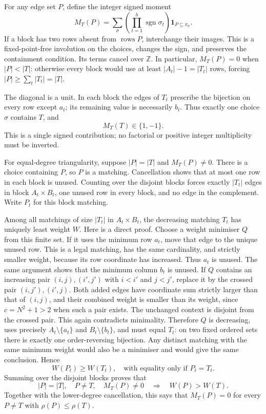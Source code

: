 \documentclass[11pt,a4paper]{article}
\theoremstyle{definition}\newtheorem{definition}[theorem]{Definition}
\theoremstyle{remark}\newtheorem{remark}[theorem]{Remark}
\begin{document}
For any edge set $P$, define the integer signed moment
\[
 M_T(P)=\sum_{\sigma}
     \left(\prod_{t=1}^{h}\operatorname{sgn}\sigma_t\right)
     \boldsymbol{1}_{P\subseteq\pi_\sigma}.
\]
If a block has two rows absent from $\operatorname{rows}P$, interchange
their images.  This is a fixed-point-free involution on the choices,
changes the sign, and preserves the containment condition.  Its terms
cancel over $\mathbb Z$.  In particular, $M_T(P)=0$ when $|P|<|T|$:
otherwise every block would use at least $|A_t|-1=|T_t|$ rows, forcing
$|P|\geq\sum_t|T_t|=|T|$.

The diagonal is a unit.  In each block the edges of $T_t$ prescribe the
bijection on every row except $a_t$; its remaining value is necessarily
$b_t$.  Thus exactly one choice $\sigma$ contains $T$, and
\[
 M_T(T)\in\{1,-1\}.
\]
This is a single signed contribution; no factorial or positive integer
multiplicity must be inverted.

For equal-degree triangularity, suppose $|P|=|T|$ and $M_T(P)\ne0$.
There is a choice containing $P$, so $P$ is a matching.  Cancellation
shows that at most one row in each block is unused.  Counting over the
disjoint blocks forces exactly $|T_t|$ edges in block $A_t\times B_t$,
one unused row in every block, and no edge in the complement.  Write
$P_t$ for this block matching.

Among all matchings of size $|T_t|$ in $A_t\times B_t$, the decreasing
matching $T_t$ has uniquely least weight $W$.  Here is a direct proof.
Choose a weight minimiser $Q$ from this finite set.  If it uses the
minimum row $a_t$, move that edge to the unique unused row.  This is a
legal matching, has the same cardinality, and strictly smaller weight,
because its row coordinate has increased.  Thus $a_t$ is unused.
The same argument shows that the minimum column $b_t$ is unused.
If $Q$ contains an increasing pair $(i,j),(i',j')$ with
$i<i'$ and $j<j'$, replace it by the crossed pair
$(i,j'),(i',j)$.  Both added edges have coordinate sum strictly larger
than that of $(i,j)$, and their combined weight is smaller than its
weight, since $c=N^2+1>2$ when such a pair exists.  The unchanged context
is disjoint from the crossed pair.  This again contradicts minimality.
Therefore $Q$ is decreasing, uses precisely $A_t\setminus\{a_t\}$
and $B_t\setminus\{b_t\}$, and must equal $T_t$: on two fixed ordered
sets there is exactly one order-reversing bijection.  Any distinct
matching with the same minimum weight would also be a minimiser and
would give the same conclusion.  Hence
\[
 W(P_t)\geq W(T_t),\quad\text{with equality only if }P_t=T_t.
\]
Summing over the disjoint blocks proves that
\[
 |P|=|T|,\quad P\ne T,\quad M_T(P)\ne0
 \quad\Longrightarrow\quad W(P)>W(T).
\]
Together with the lower-degree cancellation, this says that $M_T(P)=0$
for every $P\ne T$ with $\rho(P)\leq\rho(T)$.
\end{document}
